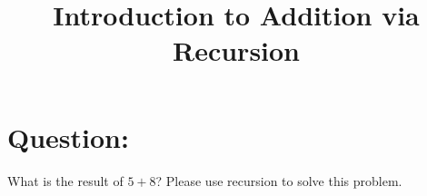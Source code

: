 \documentclass{article}
\title{Introduction to Addition via Recursion}
\author{}
\date{}
\begin{document}
\section{Question:}

What is the result of \( 5 + 8 \)? Please use recursion to solve this problem.
\end{document}
